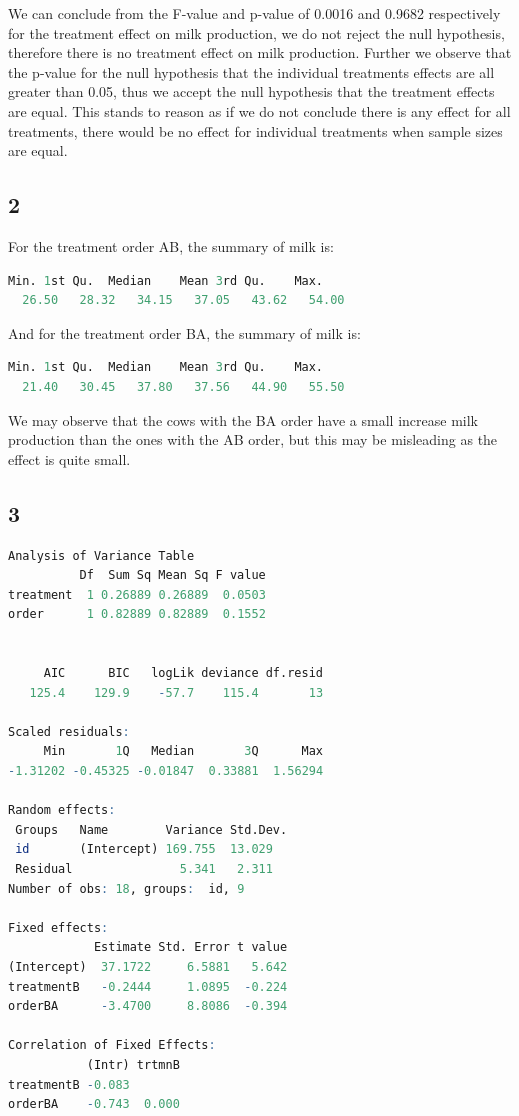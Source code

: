 \documentclass{article}
\begin{document}
    We can conclude from the F-value and p-value of 0.0016 and 0.9682 respectively for the treatment effect on milk production, we do not reject the null hypothesis, therefore there is no treatment effect on milk production. Further we observe that the p-value for the null hypothesis that the individual treatments effects are all greater than 0.05, thus we accept the null hypothesis that the treatment effects are equal. This stands to reason as if we do not conclude there is any effect for all treatments, there would be no effect for individual treatments when sample sizes are equal.
    
    \subsection*{2}
      For the treatment order AB, the summary of milk is:
	\begin{lstlisting}[language=R]
   Min. 1st Qu.  Median    Mean 3rd Qu.    Max. 
  26.50   28.32   34.15   37.05   43.62   54.00 
    \end{lstlisting}
      And for the treatment order BA, the summary of milk is:
  \begin{lstlisting}[language=R]
   Min. 1st Qu.  Median    Mean 3rd Qu.    Max. 
  21.40   30.45   37.80   37.56   44.90   55.50  
    \end{lstlisting}
    
      We may observe that the cows with the BA order have a small increase milk production than the ones with the AB order, but this may be misleading as the effect is quite small.

    \subsection*{3}
    \begin{lstlisting}[language=R]
    Analysis of Variance Table
          Df  Sum Sq Mean Sq F value
treatment  1 0.26889 0.26889  0.0503
order      1 0.82889 0.82889  0.1552


     AIC      BIC   logLik deviance df.resid 
   125.4    129.9    -57.7    115.4       13 
   
Scaled residuals: 
     Min       1Q   Median       3Q      Max 
-1.31202 -0.45325 -0.01847  0.33881  1.56294 

Random effects:
 Groups   Name        Variance Std.Dev.
 id       (Intercept) 169.755  13.029  
 Residual               5.341   2.311  
Number of obs: 18, groups:  id, 9

Fixed effects:
            Estimate Std. Error t value
(Intercept)  37.1722     6.5881   5.642
treatmentB   -0.2444     1.0895  -0.224
orderBA      -3.4700     8.8086  -0.394

Correlation of Fixed Effects:
           (Intr) trtmnB
treatmentB -0.083       
orderBA    -0.743  0.000
    \end{lstlisting}
\end{document}
